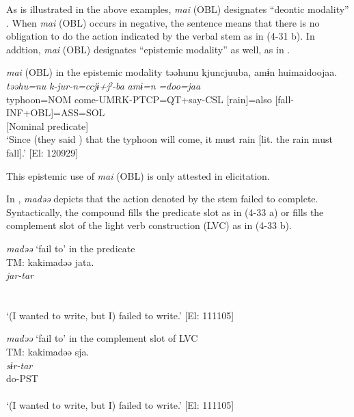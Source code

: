As is illustrated in the above examples, \textit{mai} (OBL) designates “deontic modality” \citep[823]{Lyons1977}. When \textit{mai} (OBL) occurs in negative, the sentence means that there is no obligation to do the action indicated by the verbal stem as in (4-31 b). In addtion, \textit{mai} (OBL) designates “epistemic modality” \citep[793-809]{Lyons1977} as well, as in .

\ea  \textit{mai} (OBL) in the epistemic modality \label{ex:4.32}
  \gllll təəhunu  kjuncjuuba,  amɨn   huimaidoojaa.\\
    \textit{təəhu=nu}  \textit{k-jur-n=ccjɨ+jˀ-ba}  \textit{amɨ=n} \textit{=doo=jaa}\\                                                                   
    typhoon=NOM  come-UMRK-PTCP=QT+say-CSL  [rain]=also  [fall-INF+OBL]=ASS=SOL\\                                                                   
        [Subject]                                         [Nominal predicate]\\
  \glt ‘Since (they said ) that the typhoon will come, it must rain [lit. the rain must fall].’  [El: 120929]
\z

This epistemic use of \textit{mai} (OBL) is only attested in elicitation.

In , \textit{madəə} depicts that the action denoted by the stem failed to complete. Syntactically, the compound fills the predicate slot as in (4-33 a) or fills the complement slot of the light verb construction (LVC) as in (4-33 b).

\ea \label{ex:4.33}
\ea \textit{madəə} ‘fail to’ in the predicate \label{ex:4.33a}\\
\gllll  TM:  kakimadəə  jata.\\
    \textit{}  \textit{jar-tar}\\
    [write-INF+fail.to  COP-PST]\\
    [Nominal predicate]\\
  \glt     ‘(I wanted to write, but I) failed to write.’ [El: 111105]

\ex \textit{madəə} ‘fail to’ in the complement slot of LVC\\
\gllll  TM:  kakimadəə  sja.\\
    \textit{}  \textit{sɨr-tar}\\
    [write-INF+fail.to]  do-PST\\
    [Complement]  \\
  \glt     ‘(I wanted to write, but I) failed to write.’ [El: 111105]
  \z
\z

